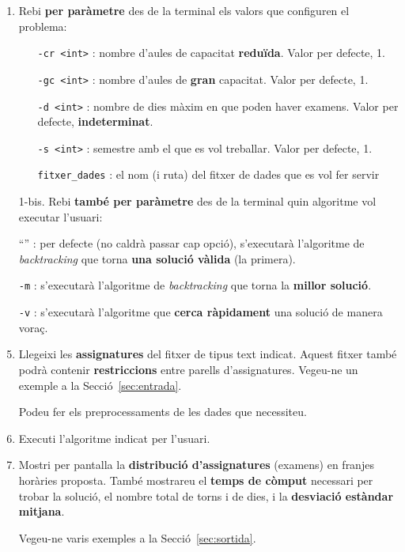 \documentclass[10pt,a4paper]{../documents/class_material_assignatura_udg}
\begin{document}
\begin{enumerate}
\item Rebi \textbf{per paràmetre} des de la terminal els valors que configuren el problema:
\begin{itemize}
\item[\texttt{-cr <int>}]: nombre d'aules de capacitat {\bf\textcolor{salmo}{r}eduïda}. Valor per defecte, 1.
\item[\texttt{-gc <int>}]: nombre d'aules de {\bf\textcolor{salmo}{g}ran} capacitat. Valor per defecte, 1.
\item[\texttt{-d <int>}]: nombre de dies màxim en que poden haver examens. Valor per defecte, \textbf{indeterminat}.
\item[\texttt{-s <int>}]: semestre amb el que es vol treballar. Valor per defecte, 1.
\item[\texttt{fitxer\_dades}]: el nom (i ruta) del fitxer de dades que es vol fer servir
\end{itemize}

\hspace{-15pt}1-bis. Rebi \textbf{també per paràmetre} des de la terminal quin algoritme vol executar l'usuari:
\item[``'']: per defecte (no caldrà passar cap opció), s'executarà l'algoritme de \textit{backtracking} que torna \textbf{una solució vàlida} (la primera).
\item[\texttt{-m}]: s'executarà l'algoritme de \textit{backtracking} que torna la \textbf{millor solució}.
\item[\texttt{-v}]: s'executarà l'algoritme que \textbf{cerca ràpidament} una solució de manera voraç.
\item Llegeixi les \textbf{assignatures} del fitxer de tipus text indicat. Aquest fitxer també podrà contenir \textbf{restriccions} entre parells d'assignatures. Vegeu-ne un exemple a la Secció~\ref{sec:entrada}.

Podeu fer els preprocessaments de les dades que necessiteu.

\item Executi l'algoritme indicat per l'usuari.
\item Mostri per pantalla la \textbf{distribució d'assignatures} (examens) en franjes horàries proposta. 
També mostrareu el \textbf{temps de còmput} necessari per trobar la solució, el nombre total de torns i de dies, i la \textbf{desviació estàndar mitjana}.

Vegeu-ne varis exemples a la Secció~\ref{sec:sortida}.
\end{enumerate}
\end{document}
